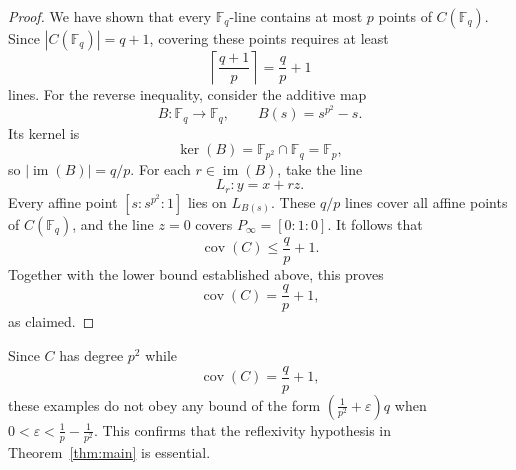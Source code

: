 \documentclass[10pt,a4paper]{amsart}
\theoremstyle{definition}
\theoremstyle{remark}
\newcommand{\bF}{\mathbb{F}}
\newcommand{\Fp}{\mathbb{F}_p}
\newcommand{\Fq}{\mathbb{F}_q}
\begin{document}
\begin{proof}
We have shown that every $\Fq$-line contains at most $p$ points of $C(\Fq)$. Since $|C(\Fq)|=q+1$, covering these points requires at least
\[
\left\lceil\frac{q+1}{p}\right\rceil = \frac{q}{p}+1
\]
lines. For the reverse inequality, consider the additive map
\[
B\colon\Fq\longrightarrow\Fq,
\qquad B(s)=s^{p^2}-s.
\]
Its kernel is
\[
\ker(B) = \bF_{p^2}\cap\Fq = \Fp,
\]
so $|\operatorname{im}(B)|=q/p$. For each $r\in\operatorname{im}(B)$, take the line
\[
L_r\colon y=x+rz.
\]
Every affine point $[s:s^{p^2}:1]$ lies on $L_{B(s)}$. These $q/p$ lines cover all affine points of $C(\Fq)$, and the line $z=0$ covers $P_\infty=[0:1:0]$. It follows that
\[
\operatorname{cov}(C)\leq\frac{q}{p}+1.
\]
Together with the lower bound established above, this proves
\[
\operatorname{cov}(C)=\frac{q}{p}+1,
\]
as claimed. \end{proof}


Since $C$ has degree $p^2$ while
\[
\operatorname{cov}(C)=\frac{q}{p}+1,
\]
these examples do not obey any bound of the form
$\left(\frac{1}{p^2}+\varepsilon\right)q$ when
$0<\varepsilon<\frac{1}{p}-\frac{1}{p^2}$. This confirms that the reflexivity hypothesis in Theorem~\ref{thm:main} is essential.
\end{document}
